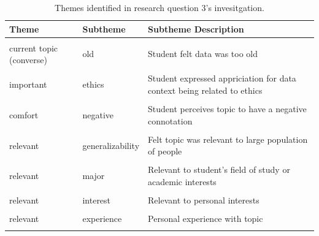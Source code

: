 \documentclass[
  letterpaper,
  DIV=11,
  numbers=noendperiod]{scrartcl}
\begin{document}
\begin{longtable}[t]{>{\raggedright\arraybackslash}p{1in}>{\raggedright\arraybackslash}p{1in}>{\raggedright\arraybackslash}p{4in}}

\caption{\label{tbl-r3-themes}Themes identified in research question 3's
invesitgation.}

\tabularnewline

\toprule
Theme & Subtheme & Subtheme Description\\
\midrule
\cellcolor{gray!10}{current topic} & \cellcolor{gray!10}{popular} & \cellcolor{gray!10}{Topic commonly discussed/popular}\\
current topic (converse) & old & Student felt data was too old\\
\cellcolor{gray!10}{important} & \cellcolor{gray!10}{important} & \cellcolor{gray!10}{Student felt the topic was important}\\
important & ethics & Student expressed appriciation for data context being related to ethics\\
\cellcolor{gray!10}{comfort} & \cellcolor{gray!10}{political} & \cellcolor{gray!10}{Commonly discussed political/controversial topic}\\
\addlinespace
comfort & negative & Student perceives topic to have a negative connotation\\
\cellcolor{gray!10}{comfort} & \cellcolor{gray!10}{comfort} & \cellcolor{gray!10}{Student felt uncomfortable about the topic}\\
relevant & generalizability & Felt topic was relevant to large population of people\\
\cellcolor{gray!10}{relevant} & \cellcolor{gray!10}{relatable} & \cellcolor{gray!10}{Student expressed data context to be relatable with no reason}\\
relevant & major & Relevant to student's field of study or academic interests\\
\addlinespace
\cellcolor{gray!10}{relevant} & \cellcolor{gray!10}{career} & \cellcolor{gray!10}{Relevant to student's future career plans}\\
relevant & interest & Relevant to personal interests\\
\cellcolor{gray!10}{relevant} & \cellcolor{gray!10}{dislike} & \cellcolor{gray!10}{Relevant to student's dislike}\\
relevant & experience & Personal experience with topic\\
\cellcolor{gray!10}{relevant} & \cellcolor{gray!10}{student} & \cellcolor{gray!10}{Relevant to daily life of a student}\\

\end{longtable}
\end{document}
